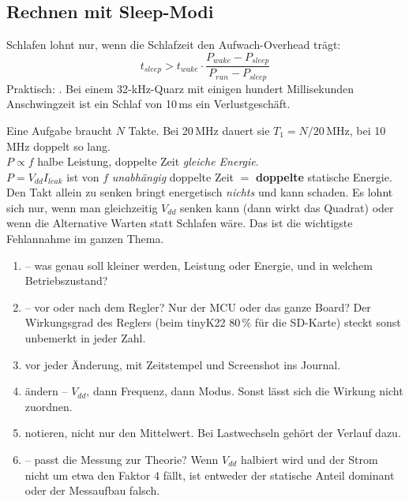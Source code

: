 \subsection{Rechnen mit Sleep-Modi}
\begin{formel}
Schlafen lohnt nur, wenn die Schlafzeit den Aufwach-Overhead trägt:
\[ t_{sleep} > t_{wake} \cdot \frac{P_{wake} - P_{sleep}}{P_{run} - P_{sleep}} \]
Praktisch: . Bei einem 32-kHz-Quarz mit
einigen hundert Millisekunden Anschwingzeit ist ein Schlaf von 10\,ms
ein Verlustgeschäft.
\end{formel}
\begin{bsp}
Eine Aufgabe braucht $N$ Takte. Bei 20\,MHz dauert sie
$T_1 = N/20\,$MHz, bei 10\,MHz doppelt so lang.\\
 $P \propto f$ \ra halbe Leistung, doppelte Zeit
\ra \emph{gleiche Energie}.\\
 $P = V_{dd}I_{leak}$ ist von $f$ \emph{unabhängig}
\ra doppelte Zeit $=$ \textbf{doppelte} statische Energie.\\[2pt]
\merkzeile Den Takt allein zu senken bringt energetisch \emph{nichts}
und kann schaden. Es lohnt sich nur, wenn man gleichzeitig $V_{dd}$
senken kann (dann wirkt das Quadrat) oder wenn die Alternative Warten
statt Schlafen wäre. Das ist die wichtigste Fehlannahme im ganzen Thema.
\end{bsp}

\begin{rezept}
\begin{enumerate}
\item {} -- was genau soll kleiner werden, Leistung
      oder Energie, und in welchem Betriebszustand?
\item {} -- vor oder nach dem Regler? Nur der
      MCU oder das ganze Board? Der Wirkungsgrad des Reglers
      (beim tinyK22 80\,\% für die SD-Karte) steckt sonst
      unbemerkt in jeder Zahl.
\item {} vor jeder Änderung, mit Zeitstempel und
      Screenshot ins Journal.
\item {} ändern -- $V_{dd}$, dann
      Frequenz, dann Modus. Sonst lässt sich die Wirkung nicht
      zuordnen.
\item {} notieren, nicht nur den Mittelwert.
      Bei Lastwechseln gehört der Verlauf dazu.
\item {} -- passt die Messung zur Theorie? Wenn
      $V_{dd}$ halbiert wird und der Strom nicht um etwa den Faktor 4
      fällt, ist entweder der statische Anteil dominant oder der
      Messaufbau falsch.
\end{enumerate}
\end{rezept}

